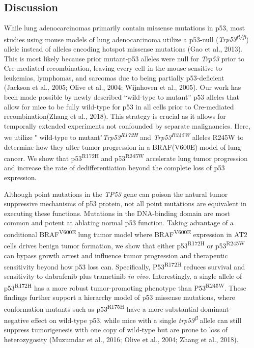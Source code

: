 \hypertarget{discussion-1}{%
\subsection{Discussion}\label{discussion-1}}

While lung adenocarcinomas primarily contain missense mutations in p53, most studies using mouse models of lung adenocarcinoma utilize a p53-null (\emph{Trp53\textsuperscript{fl/fl}}) allele instead of alleles encoding hotspot missense mutations (Gao et al., 2013). This is most likely because prior mutant-p53 alleles were null for \emph{Trp53} prior to Cre-mediated recombination, leaving every cell in the mouse sensitive to leukemias, lymphomas, and sarcomas due to being partially p53-deficient (Jackson et al., 2005; Olive et al., 2004; Wijnhoven et al., 2005). Our work has been made possible by newly described ``wild-type to mutant'' p53 alleles that allow for mice to be fully wild-type for p53 in all cells prior to Cre-mediated recombination(Zhang et al., 2018). This strategy is crucial as it allows for temporally extended experiments not confounded by separate malignancies. Here, we utilize " wild-type to mutant"\emph{Trp53\textsuperscript{R172H}} and \emph{Trp53\textsuperscript{R245W}} alleles R245W to determine how they alter tumor progression in a BRAF(V600E) model of lung cancer. We show that p53\textsuperscript{R172H} and p53\textsuperscript{R245W} accelerate lung tumor progression and increase the rate of dedifferentiation beyond the complete loss of p53 expression.

Although point mutations in the \emph{TP53} gene can poison the natural tumor suppressive mechanisms of p53 protein, not all point mutations are equivalent in executing these functions. Mutations in the DNA-binding domain are most common and potent at ablating normal p53 function. Taking advantage of a conditional BRAF\textsuperscript{V600E} lung tumor model where BRAF\textsuperscript{V600E} expression in AT2 cells drives benign tumor formation, we show that either p53\textsuperscript{R172H} or p53\textsuperscript{R245W} can bypass growth arrest and influence tumor progression and therapeutic sensitivity beyond how p53 loss can. Specifically, P53\textsuperscript{R172H} reduces survival and sensitivity to dabrafenib plus trametinib \emph{in vivo}. Interestingly, a single allele of p53\textsuperscript{R172H} has a more robust tumor-promoting phenotype than P53\textsuperscript{R245W}. These findings further support a hierarchy model of p53 missense mutations, where conformation mutants such as p53\textsuperscript{R175H} have a more substantial dominant-negative effect on wild-type p53, while mice with a single \emph{trp53\textsuperscript{fl}} allele can still suppress tumorigenesis with one copy of wild-type but are prone to loss of heterozygosity (Muzumdar et al., 2016; Olive et al., 2004; Zhang et al., 2018).

